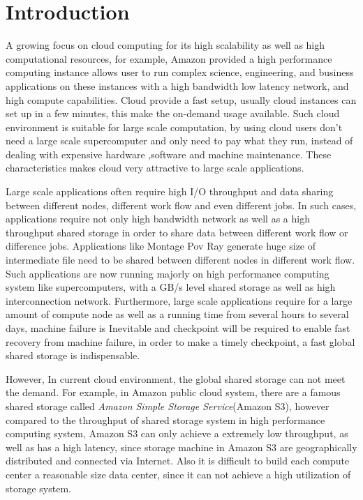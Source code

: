 \section{Introduction}
\label{sec:introduction}
A growing focus on cloud computing for its high scalability as well as high computational
resources, for example, Amazon provided a high performance computing instance allows user to run
complex science, engineering, and business applications on these instances with a high bandwidth low latency
network, and high compute capabilities.
Cloud provide a fast setup, usually cloud instances can set up in a few minutes, this
make the on-demand usage available.
Such cloud environment is suitable for large scale
computation, by using cloud users don't need a large scale supercomputer and only need to pay
what they run, instead of dealing with expensive hardware ,software and machine maintenance.
These characteristics makes cloud very attractive to large scale applications.

Large scale applications often require high I/O
throughput and data sharing between different nodes, different work flow and even different jobs.
In such cases, applications require not only high bandwidth network as well as a high throughput
shared storage in order to share data between different work flow or difference jobs.
Applications like Montage\cite{montage} Pov Ray\cite{povray} generate huge size of intermediate file
need to be shared between different nodes in different work flow.
Such applications are now running majorly on high performance computing system like supercomputers,
with a GB/s level shared storage as well as high interconnection network.
Furthermore, large scale applications require for a large amount of compute node as well as a
running time from several hours to several days, machine failure is Inevitable and checkpoint will be required to enable
fast recovery from machine failure\cite{checkpointing}, in order to make a timely checkpoint, a
fast global shared storage is indispensable.

However, In current cloud environment, the global shared storage can not meet the demand.
For example, in Amazon public cloud system, there are a famous shared storage called \emph{Amazon
Simple Storage Service}(Amazon S3)\cite{AMAZON_AWS}, however compared to the throughput of shared
storage system in high performance computing system, Amazon S3 can only achieve a extremely low throughput,
as well as has a high latency, since storage machine in Amazon S3 are geographically distributed and connected via Internet.
Also it is difficult to build each compute center a reasonable size data center, since it can not
achieve a high utilization of storage system.

